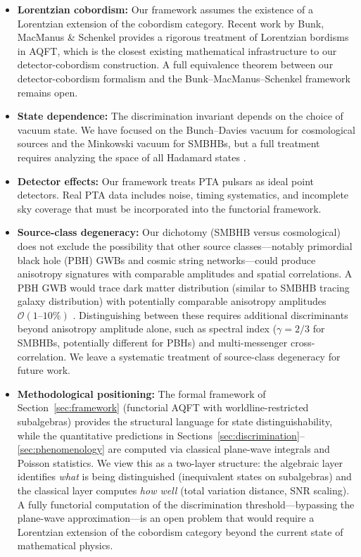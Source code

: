 \documentclass[11pt,a4paper]{article}
\begin{document}
\begin{itemize}
\item \textbf{Lorentzian cobordism:} Our framework assumes the existence of a Lorentzian extension of the cobordism category. Recent work by Bunk, MacManus \& Schenkel \cite{Bunk:2025} provides a rigorous treatment of Lorentzian bordisms in AQFT, which is the closest existing mathematical infrastructure to our detector-cobordism construction. A full equivalence theorem between our detector-cobordism formalism and the Bunk--MacManus--Schenkel framework remains open.
\item \textbf{State dependence:} The discrimination invariant depends on the choice of vacuum state. We have focused on the Bunch--Davies vacuum for cosmological sources and the Minkowski vacuum for SMBHBs, but a full treatment requires analyzing the space of all Hadamard states \cite{Hollands:2003,Moretti:2017}.
\item \textbf{Detector effects:} Our framework treats PTA pulsars as ideal point detectors. Real PTA data includes noise, timing systematics, and incomplete sky coverage that must be incorporated into the functorial framework.
\item \textbf{Source-class degeneracy:} Our dichotomy (SMBHB versus cosmological) does not exclude the possibility that other source classes---notably primordial black hole (PBH) GWBs and cosmic string networks---could produce anisotropy signatures with comparable amplitudes and spatial correlations. A PBH GWB would trace dark matter distribution (similar to SMBHB tracing galaxy distribution) with potentially comparable anisotropy amplitudes $\mathcal{O}(1\text{--}10\%)$ \cite{Raidal:2017}. Distinguishing between these requires additional discriminants beyond anisotropy amplitude alone, such as spectral index ($\gamma = 2/3$ for SMBHBs, potentially different for PBHs) and multi-messenger cross-correlation. We leave a systematic treatment of source-class degeneracy for future work.
\item \textbf{Methodological positioning:} The formal framework of Section~\ref{sec:framework} (functorial AQFT with worldline-restricted subalgebras) provides the structural language for state distinguishability, while the quantitative predictions in Sections~\ref{sec:discrimination}--\ref{sec:phenomenology} are computed via classical plane-wave integrals and Poisson statistics. We view this as a two-layer structure: the algebraic layer identifies \emph{what} is being distinguished (inequivalent states on subalgebras) and the classical layer computes \emph{how well} (total variation distance, SNR scaling). A fully functorial computation of the discrimination threshold---bypassing the plane-wave approximation---is an open problem that would require a Lorentzian extension of the cobordism category beyond the current state of mathematical physics.
\end{itemize}
\end{document}
